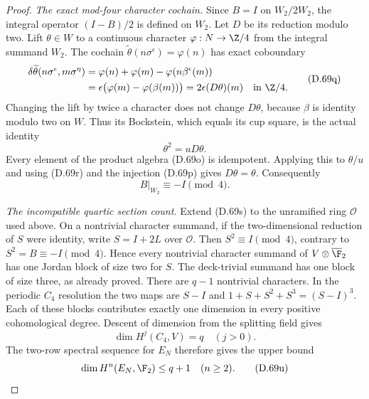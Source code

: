 \begin{proof}
\emph{The exact mod-four character cochain.}
Since $B=I$ on $W_2/2W_2$, the integral operator
$(I-B)/2$ is defined on $W_2$. Let $D$ be its
reduction modulo two.
Lift $\theta\in W$ to a continuous character
$\varphi:N\to\Z/4$ from the integral summand $W_2$.
The cochain
$\widetilde\theta(n\sigma^\epsilon)=\varphi(n)$
has exact coboundary
\[
 \begin{aligned}
 \delta\widetilde\theta
       (n\sigma^\epsilon,m\sigma^\eta)
 &=\varphi(n)+\varphi(m)
                   -\varphi(n\beta^\epsilon(m))\\
 &=\epsilon\bigl(\varphi(m)-\varphi(\beta(m))\bigr)
       =2\epsilon(D\theta)(m)\quad\text{in }\Z/4.
 \end{aligned}                                               \tag{D.69q}
\]
Changing the lift by twice a character does not
change $D\theta$, because $\beta$ is identity
modulo two on $W$.
Thus its Bockstein, which equals its cup square,
is the actual identity
\[
                           \theta^2=uD\theta .
                                                               \tag{D.69r}
\]
Every element of the product algebra (D.69o) is
idempotent. Applying this to $\theta/u$ and using
(D.69r) and the injection (D.69p) gives $D\theta=\theta$.
Consequently
\[
                         B|_{W_2}\equiv -I\pmod4.          \tag{D.69s}
\]

\emph{The incompatible quartic section count.}
Extend (D.69s) to the unramified ring $\mathcal O$
used above. On a nontrivial character summand,
if the two-dimensional reduction of $S$ were
identity, write $S=I+2L$ over $\mathcal O$.
Then $S^2\equiv I\pmod4$, contrary to
$S^2=B\equiv-I\pmod4$.
Hence every nontrivial character summand of
$V\otimes\overline{\F}_2$ has one Jordan block
of size two for $S$. The deck-trivial summand
has one block of size three, as already proved.
There are $q-1$ nontrivial characters.
In the periodic $C_4$ resolution the two maps
are $S-I$ and
$1+S+S^2+S^3=(S-I)^3$.
Each of these blocks contributes exactly one
dimension in every positive cohomological degree.
Descent of dimension from the splitting field gives
\[
                         \dim H^j(C_4,V)=q\quad(j>0).
                                                               \tag{D.69t}
\]
The two-row spectral sequence for $E_N$ therefore
gives the upper bound
\[
                         \dim H^n(E_N,\F_2)\leq q+1
                                      \quad(n\geq2).       \tag{D.69u}
\]


\end{proof}
